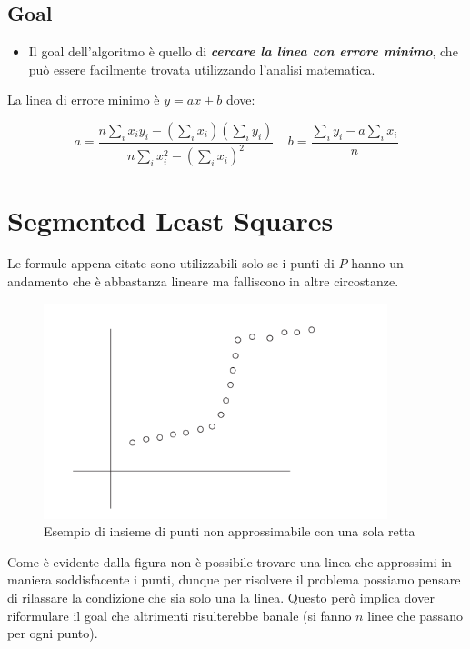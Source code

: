 \subsection{Goal}

\begin{itemize}
  \item
        Il goal dell'algoritmo è quello di \textbf{\emph{cercare la linea con
            errore minimo}}, che può essere facilmente trovata utilizzando
        l'analisi matematica.
\end{itemize}



La linea di errore minimo è $y = ax + b$ dove:

$$
  a = \frac{n \sum_{i} x_i y_i - (\sum_{i} x_i) (\sum_{i} y_i)}{n \sum_{i} x_i^2 - (\sum_{i} x_i)^2} \ \ \  \ \ b = \frac{\sum_{i} y_i - a \sum_{i} x_i}{n}
$$

\section{Segmented Least Squares}

Le formule appena citate sono utilizzabili solo se i punti di $P$
hanno un andamento che è abbastanza lineare ma falliscono in altre
circostanze.

\begin{figure}[H]
  \centering
  \includegraphics[width = 10cm, keepaspectratio]{capitoli/programmazione_dinamica/imgs/seg_llsqr.png}
  \caption{Esempio di insieme di punti non approssimabile con una sola retta}
\end{figure}

Come è evidente dalla figura non è possibile trovare una linea che
approssimi in maniera soddisfacente i punti, dunque per risolvere il
problema possiamo pensare di rilassare la condizione che sia solo una la
linea. Questo però implica dover riformulare il goal che altrimenti
risulterebbe banale (si fanno $n$ linee che passano per ogni punto).

